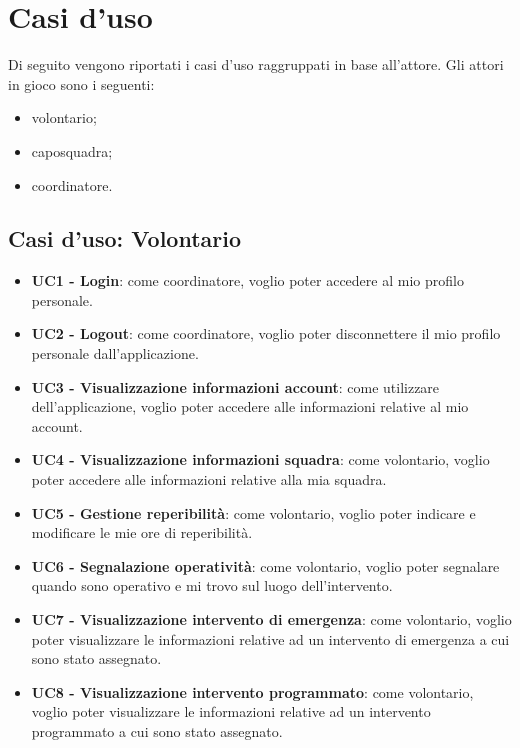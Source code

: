 \section{Casi d'uso}
Di seguito vengono riportati i casi d'uso raggruppati in base all'attore. Gli attori in gioco sono i seguenti:
\begin{itemize}
	\item volontario;
	\item caposquadra;
	\item coordinatore.
\end{itemize}

\subsection{Casi d'uso: Volontario}
\begin{itemize}
	\item \textbf{UC1 - Login}:
	come coordinatore, voglio poter accedere al mio profilo personale.
	
	\item \textbf{UC2 - Logout}:
	come coordinatore, voglio poter disconnettere il mio profilo personale dall'applicazione.
	
	\item \textbf{UC3 - Visualizzazione informazioni account}:
	come utilizzare dell'applicazione, voglio poter accedere alle informazioni relative al mio account.
	
	\item \textbf{UC4 - Visualizzazione informazioni squadra}:
	come volontario, voglio poter accedere alle informazioni relative alla mia squadra.
	
	\item \textbf{UC5 - Gestione reperibilità}:
	come volontario, voglio poter indicare e modificare le mie ore di reperibilità.
	
	\item \textbf{UC6 - Segnalazione operatività}:
	come volontario, voglio poter segnalare quando sono operativo e mi trovo sul luogo dell'intervento.
	
	\item \textbf{UC7 - Visualizzazione intervento di emergenza}:
	come volontario, voglio poter visualizzare le informazioni relative ad un intervento di emergenza a cui sono stato assegnato.
	
	\item \textbf{UC8 - Visualizzazione intervento programmato}:
	come volontario, voglio poter visualizzare le informazioni relative ad un intervento programmato a cui sono stato assegnato.
	

\end{itemize}
